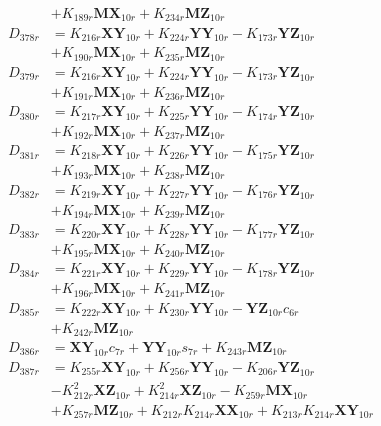 \begin{multicols}{2}
\begin{align}
&+ K_{189r}\mathbf{MX}_{10r} + K_{234r}\mathbf{MZ}_{10r} \nonumber \\
D_{378r} &= K_{216r}\mathbf{XY}_{10r} + K_{224r}\mathbf{YY}_{10r} - K_{173r}\mathbf{YZ}_{10r}  \nonumber \\
&+ K_{190r}\mathbf{MX}_{10r} + K_{235r}\mathbf{MZ}_{10r} \nonumber \\
D_{379r} &= K_{216r}\mathbf{XY}_{10r} + K_{224r}\mathbf{YY}_{10r} - K_{173r}\mathbf{YZ}_{10r}  \nonumber \\
&+ K_{191r}\mathbf{MX}_{10r} + K_{236r}\mathbf{MZ}_{10r} \nonumber \\
D_{380r} &= K_{217r}\mathbf{XY}_{10r} + K_{225r}\mathbf{YY}_{10r} - K_{174r}\mathbf{YZ}_{10r}  \nonumber \\
&+ K_{192r}\mathbf{MX}_{10r} + K_{237r}\mathbf{MZ}_{10r} \nonumber \\
D_{381r} &= K_{218r}\mathbf{XY}_{10r} + K_{226r}\mathbf{YY}_{10r} - K_{175r}\mathbf{YZ}_{10r}  \nonumber \\
&+ K_{193r}\mathbf{MX}_{10r} + K_{238r}\mathbf{MZ}_{10r} \nonumber \\
D_{382r} &= K_{219r}\mathbf{XY}_{10r} + K_{227r}\mathbf{YY}_{10r} - K_{176r}\mathbf{YZ}_{10r}  \nonumber \\
&+ K_{194r}\mathbf{MX}_{10r} + K_{239r}\mathbf{MZ}_{10r} \nonumber \\
D_{383r} &= K_{220r}\mathbf{XY}_{10r} + K_{228r}\mathbf{YY}_{10r} - K_{177r}\mathbf{YZ}_{10r}  \nonumber \\
&+ K_{195r}\mathbf{MX}_{10r} + K_{240r}\mathbf{MZ}_{10r} \nonumber \\
D_{384r} &= K_{221r}\mathbf{XY}_{10r} + K_{229r}\mathbf{YY}_{10r} - K_{178r}\mathbf{YZ}_{10r}  \nonumber \\
&+ K_{196r}\mathbf{MX}_{10r} + K_{241r}\mathbf{MZ}_{10r} \nonumber \\
D_{385r} &= K_{222r}\mathbf{XY}_{10r} + K_{230r}\mathbf{YY}_{10r} - \mathbf{YZ}_{10r}c_{6r}  \nonumber \\
&+ K_{242r}\mathbf{MZ}_{10r} \nonumber \\
D_{386r} &= \mathbf{XY}_{10r}c_{7r} + \mathbf{YY}_{10r}s_{7r} + K_{243r}\mathbf{MZ}_{10r} \nonumber \\
D_{387r} &= K_{255r}\mathbf{XY}_{10r} + K_{256r}\mathbf{YY}_{10r} - K_{206r}\mathbf{YZ}_{10r}  \nonumber \\
&- K_{212r}^2\mathbf{XZ}_{10r} + K_{214r}^2\mathbf{XZ}_{10r} - K_{259r}\mathbf{MX}_{10r}  \nonumber \\
&+ K_{257r}\mathbf{MZ}_{10r} + K_{212r}K_{214r}\mathbf{XX}_{10r} + K_{213r}K_{214r}\mathbf{XY}_{10r}  \nonumber \\

\end{align}
\end{multicols}
